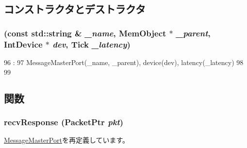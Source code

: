 \subsection{コンストラクタとデストラクタ}
\hypertarget{classX86ISA_1_1IntDevice_1_1IntMasterPort_afa923acbe92fee643145777cd0d319ec}{
\subsubsection[{IntMasterPort}]{ (const std::string \& {\em \_\-name}, \/  {\bf MemObject} $\ast$ {\em \_\-parent}, \/  {\bf IntDevice} $\ast$ {\em dev}, \/  {\bf Tick} {\em \_\-latency})}}
\label{classX86ISA_1_1IntDevice_1_1IntMasterPort_afa923acbe92fee643145777cd0d319ec}



\begin{DoxyCode}
96                                                      :
97             MessageMasterPort(_name, _parent), device(dev), latency(_latency)
98         {
99         }

\end{DoxyCode}


\subsection{関数}
\hypertarget{classX86ISA_1_1IntDevice_1_1IntMasterPort_a96d1a00beed669f9145d55bc3675d99c}{
\subsubsection[{recvResponse}]{ recvResponse ({\bf PacketPtr} {\em pkt})}}
\label{classX86ISA_1_1IntDevice_1_1IntMasterPort_a96d1a00beed669f9145d55bc3675d99c}


\hyperlink{classMessageMasterPort_ae473b2a0c55e73359b9643810869ca81}{MessageMasterPort}を再定義しています。


